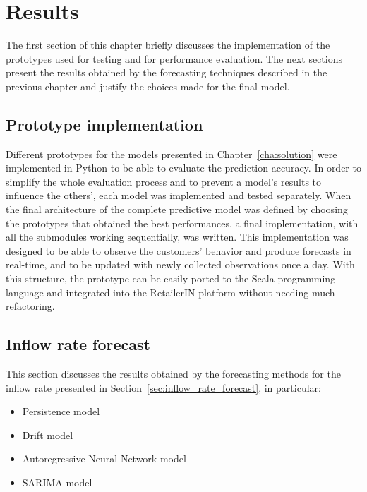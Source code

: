 \chapter{Results}
\label{cha:results}

The first section of this chapter briefly discusses the implementation of the prototypes used for testing and for performance evaluation. The next sections present the results obtained by the forecasting techniques described in the previous chapter and justify the choices made for the final model.

\section{Prototype implementation}
\label{sec:prototype_implementation}

Different prototypes for the models presented in Chapter~\ref{cha:solution} were implemented in Python to be able to evaluate the prediction accuracy. In order to simplify the whole evaluation process and to prevent a model's results to influence the others', each model was implemented and tested separately. When the final architecture of the complete predictive model was defined by choosing the prototypes that obtained the best performances, a final implementation, with all the submodules working sequentially, was written. This implementation was designed to be able to observe the customers' behavior and produce forecasts in real-time, and to be updated with newly collected observations once a day. With this structure, the prototype can be easily ported to the Scala programming language and integrated into the RetailerIN platform without needing much refactoring.

\section{Inflow rate forecast}
\label{sec:inflow_rate_forecast_results}

This section discusses the results obtained by the forecasting methods for the inflow rate presented in Section~\ref{sec:inflow_rate_forecast}, in particular:
\begin{itemize}
  \item Persistence model
  \item Drift model
  \item Autoregressive Neural Network model
  \item SARIMA model
\end{itemize}

